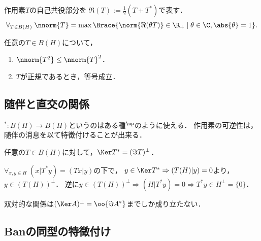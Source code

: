 \documentclass[uplatex,dvipdfmx]{jsreport}
\begin{document}
\begin{proposition}[数域半径の特徴付け]
    作用素$T$の自己共役部分を
    $\Re(T):=\frac{1}{2}(T+T^*)$で表す．
    \[\forall_{T\in B(H)}\;\nnorm{T}=\max\Brace{\norm{\Re(\theta T)}\in\R_+\mid\theta\in\C,\abs{\theta}=1}.\]
\end{proposition}

\begin{proposition}
    任意の$T\in B(H)$について，
    \begin{enumerate}
        \item $\nnorm{T^2}\le\nnorm{T}^2$．
        \item $T$が正規であるとき，等号成立．
    \end{enumerate}
\end{proposition}

\subsection{随伴と直交の関係}

\begin{tcolorbox}[colframe=ForestGreen, colback=ForestGreen!10!white,breakable,colbacktitle=ForestGreen!40!white,coltitle=black,fonttitle=\bfseries\sffamily,
title=]
    ${}^*:B(H)\to B(H)$というのはある種${}^\op$のように使える．
    作用素の可逆性は，随伴の消息を以て特徴付けることが出来る．
\end{tcolorbox}

\begin{proposition}\label{prop-Ker-of-adjoint-operator}
    任意の$T\in B(H)$に対して，$\Ker T^*=(\Im T)^\perp$．
\end{proposition}
\begin{Proof}
    $\forall_{x,y\in H}\;(x|T^*y)=(Tx|y)$の下で，
    $y\in\Ker T^*\Rightarrow (T(H)|y)=0$より，$y\in(T(H))^\perp$．
    逆に$y\in(T(H))^\perp\Rightarrow (H|T^*y)=0\Rightarrow T^*y\in H^\perp=\{0\}$．
\end{Proof}
\begin{remark}
    双対的な関係は$(\Ker A)^\perp=\oo{\Im A^*}$までしか成り立たない．
\end{remark}

\subsection{Banの同型の特徴付け}
\end{document}
